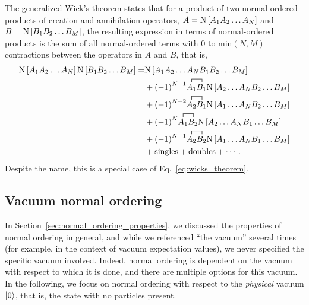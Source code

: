 The generalized Wick's theorem states that
for a product of two normal-ordered products of creation and annihilation operators,
$A=\text{N}\left[A_1 A_2 \ldots A_N\right]$ and $B=\text{N}\left[B_1 B_2 \ldots B_M\right]$,
the resulting expression in terms of normal-ordered products
is the sum of all normal-ordered terms with 0 to $\text{min}(N, M)$ contractions
between the operators in $A$ and $B$, that is,
\begin{equation}\label{eq:gen_wicks_theorem}
  \begin{split}
    \nogen{A_1 A_2 \ldots A_N} \nogen{B_1 B_2 \ldots B_M} = &
    \nogen{A_1 A_2 \ldots A_N B_1 B_2 \ldots B_M} \\
    & + {(-1)}^{N-1} \acontraction{}{A_1}{}{B_1} A_1 B_1 \nogen{A_2 \ldots A_N B_2 \ldots B_M} \\
    & + {(-1)}^{N-2} \acontraction{}{A_2}{}{B_1} A_2 B_1 \nogen{A_1 \ldots A_N B_2 \ldots B_M} \\
    & + {(-1)}^{N} \acontraction{}{A_1}{}{B_2} A_1 B_2 \nogen{A_2 \ldots A_N B_1 \ldots B_M} \\
    & + {(-1)}^{N-1} \acontraction{}{A_2}{}{B_2} A_2 B_2 \nogen{A_1 \ldots A_N B_1 \ldots B_M} \\
    & + \text{singles} + \text{doubles} + \cdots\,.
  \end{split}
\end{equation}
Despite the name, this is a special case of Eq.~\ref{eq:wicks_theorem}.

\subsection{Vacuum normal ordering}

In Section~\ref{sec:normal_ordering_properties},
we discussed the properties of normal ordering in general,
and while we referenced ``the vacuum'' several times
(for example, in the context of vacuum expectation values),
we never specified the specific vacuum involved.
Indeed, normal ordering is dependent on the vacuum with respect to which it is done,
and there are multiple options for this vacuum.
In the following, we focus on normal ordering
with respect to the \textit{physical} vacuum $\ket{0}$,
that is, the state with no particles present.

